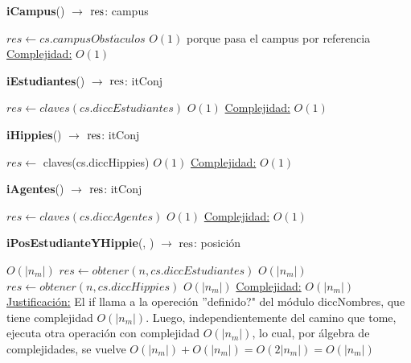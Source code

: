 \begin{Algoritmos}

\begin{algorithm}[H]{\textbf{iCampus}() $\to$ $\res$: campus}
	\begin{algorithmic}
       	\State $res \gets cs.campusObst\acute{a}culos$ \Comment $O(1)$ porque pasa el campus por referencia
		\medskip
		\Statex \underline{Complejidad:} $O(1)$
	\end{algorithmic}
\end{algorithm}

\begin{algorithm}[H]{\textbf{iEstudiantes}() $\to$ $\res$: itConj}
	\begin{algorithmic}
    \State $res \gets claves(cs.diccEstudiantes)$ \Comment $O(1)$
    \medskip
	\Statex \underline{Complejidad:} $O(1)$
	\end{algorithmic}
\end{algorithm}

\begin{algorithm}[H]{\textbf{iHippies}() $\to$ $\res$: itConj}
	\begin{algorithmic}
    \State $res \gets$ claves(cs.diccHippies) \Comment $O(1)$
    \medskip
	\Statex \underline{Complejidad:} $O(1)$
	\end{algorithmic}
\end{algorithm}
  
\begin{algorithm}[H]{\textbf{iAgentes}() $\to$ $\res$: itConj}
	\begin{algorithmic}
    \State $res \gets claves(cs.diccAgentes)$ \Comment $O(1)$
    \medskip
	\Statex \underline{Complejidad:} $O(1)$
	\end{algorithmic}
\end{algorithm}

\begin{algorithm}[H]{\textbf{iPosEstudianteYHippie}(, ) $\to$ $\res$: posici\'on}
	\begin{algorithmic}
		 \Comment $O(|n_{m}|)$
        	\State $res \gets obtener(n,cs.diccEstudiantes)$	\Comment $O(|n_{m}|)$
		\Else
			\State $res \gets obtener(n,cs.diccHippies)$	\Comment $O(|n_{m}|)$
        \EndIf
        \medskip
		\Statex \underline{Complejidad:} $O(|n_{m}|)$
        \Statex \underline{Justificaci\'on:} El if llama a la opereci\'on ''definido?" del m\'odulo diccNombres, que tiene complejidad $O(|n_{m}|)$. Luego, independientemente del camino que tome, ejecuta otra operación con complejidad $O(|n_{m}|)$, lo cual, por \'algebra de complejidades, se vuelve $O(|n_{m}|) + O(|n_{m}|) = O(2|n_{m}|) = O(|n_{m}|)$
	\end{algorithmic}
\end{algorithm}


\end{Algoritmos}
